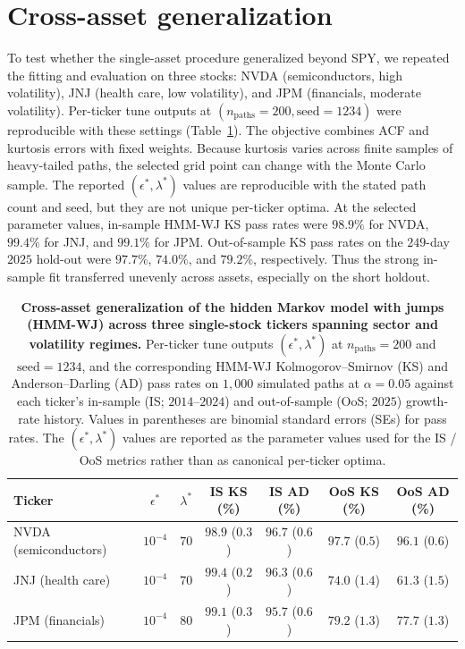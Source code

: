 \section{Cross-asset generalization}
\label{sec:supp-cross-asset}

To test whether the single-asset procedure generalized beyond SPY, we
repeated the fitting and evaluation on three stocks: NVDA
(semiconductors, high volatility), JNJ (health care, low
volatility), and JPM (financials, moderate volatility). Per-ticker
tune outputs at $(n_{\mathrm{paths}} = 200, \mathrm{seed} = 1234)$
were reproducible with these settings (Table~\ref{tab:cross_asset}).
The objective combines
ACF and kurtosis errors with fixed weights. Because kurtosis varies
across finite samples of heavy-tailed paths, the selected grid point
can change with the Monte Carlo sample. The reported
$(\epsilon^{*},\lambda^{*})$ values are reproducible with the stated
path count and seed, but they are not unique per-ticker optima. At the
selected parameter values, in-sample HMM-WJ KS pass rates were
$98.9\%$ for NVDA, $99.4\%$ for JNJ, and $99.1\%$ for JPM.
Out-of-sample KS pass rates on the $249$-day $2025$ hold-out were
$97.7\%$, $74.0\%$, and $79.2\%$, respectively. Thus the strong
in-sample fit transferred unevenly across assets, especially on the
short holdout.

\begin{table}[H]
\centering
\caption{\textbf{Cross-asset generalization of the hidden Markov model
    with jumps (HMM-WJ) across three
    single-stock tickers spanning sector and volatility regimes.}
    Per-ticker tune outputs $(\epsilon^{*}, \lambda^{*})$ at
    $n_{\mathrm{paths}} = 200$ and $\mathrm{seed} = 1234$, and the
    corresponding HMM-WJ Kolmogorov--Smirnov (KS) and Anderson--Darling
    (AD) pass rates on $1{,}000$ simulated paths at $\alpha = 0.05$
    against each ticker's in-sample (IS; $2014$--$2024$) and out-of-sample
    (OoS; $2025$) growth-rate history. Values in parentheses are binomial
    standard errors (SEs) for pass rates. The
    $(\epsilon^{*}, \lambda^{*})$ values are reported as the parameter
    values used for the IS / OoS metrics rather than as canonical
    per-ticker optima.}
\label{tab:cross_asset}
\small
\begin{tabular}{@{}lcccccc@{}}
\toprule
\textbf{Ticker} & \textbf{$\epsilon^{*}$} & \textbf{$\lambda^{*}$}
  & \textbf{IS KS (\%)} & \textbf{IS AD (\%)}
  & \textbf{OoS KS (\%)} & \textbf{OoS AD (\%)} \\ \midrule
NVDA (semiconductors)    & $10^{-4}$ & $70$ & $98.9$ ($0.3$) & $96.7$ ($0.6$) & $97.7$ ($0.5$) & $96.1$ ($0.6$) \\
JNJ (health care)        & $10^{-4}$ & $70$ & $99.4$ ($0.2$) & $96.3$ ($0.6$) & $74.0$ ($1.4$) & $61.3$ ($1.5$) \\
JPM (financials)         & $10^{-4}$ & $80$ & $99.1$ ($0.3$) & $95.7$ ($0.6$) & $79.2$ ($1.3$) & $77.7$ ($1.3$) \\
\bottomrule
\end{tabular}
\end{table}

